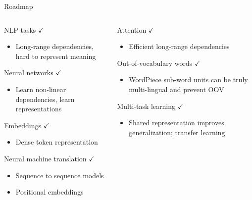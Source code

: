 \documentclass[12pt,aspectratio=169,handout]{beamer}
\begin{document}
\begin{frame}{Roadmap}
	
	\begin{columns}
		
		\begin{column}{0.5\linewidth}
			
			
			NLP tasks $\checkmark$
			
			\begin{itemize}
				\item {\scriptsize Long-range dependencies, hard to represent meaning}
			\end{itemize}
			
			Neural networks $\checkmark$
			
			\begin{itemize}
				\item {\scriptsize Learn non-linear dependencies, learn representations}
			\end{itemize}
			
			Embeddings $\checkmark$
			
			\begin{itemize}
				\item {\scriptsize Dense token representation}
			\end{itemize}
			
			Neural machine translation $\checkmark$
			
			\begin{itemize}
				\item {\scriptsize Sequence to sequence models}
				\item {\scriptsize Positional embeddings}
			\end{itemize}
			
		\end{column}
		
		\begin{column}{0.5\linewidth}
			
			Attention $\checkmark$
			
			\begin{itemize}
				\item {\scriptsize Efficient long-range dependencies}
			\end{itemize}
			
			
			Out-of-vocabulary words $\checkmark$
			
			\begin{itemize}
				\item {\scriptsize WordPiece sub-word units can be truly multi-lingual and prevent OOV}
			\end{itemize}
			
			
			Multi-task learning $\checkmark$
			
			\begin{itemize}
				\item {\scriptsize Shared representation improves generalization; transfer learning}
			\end{itemize}
			
			
		\end{column}
		
	\end{columns}
	
\end{frame}
\end{document}
